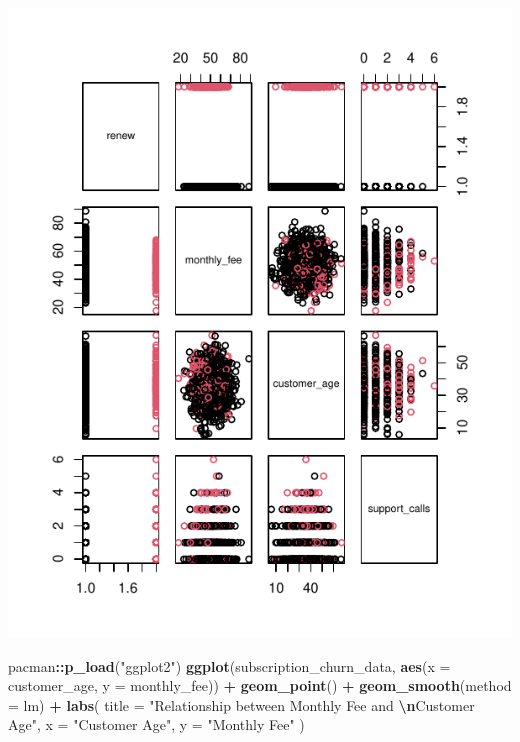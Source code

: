 \documentclass[
]{article}
\newenvironment{Shaded}{\begin{snugshade}}{\end{snugshade}}
\newcommand{\AttributeTok}[1]{\textcolor[rgb]{0.13,0.29,0.53}{#1}}
\newcommand{\FunctionTok}[1]{\textcolor[rgb]{0.13,0.29,0.53}{\textbf{#1}}}
\newcommand{\NormalTok}[1]{#1}
\newcommand{\SpecialCharTok}[1]{\textcolor[rgb]{0.81,0.36,0.00}{\textbf{#1}}}
\newcommand{\StringTok}[1]{\textcolor[rgb]{0.31,0.60,0.02}{#1}}
\begin{document}
\includegraphics{3_logistic_regression_files/figure-latex/scatter_plot_1-1.pdf}

\begin{Shaded}
\begin{Highlighting}[]
\NormalTok{pacman}\SpecialCharTok{::}\FunctionTok{p\_load}\NormalTok{(}\StringTok{"ggplot2"}\NormalTok{)}
\FunctionTok{ggplot}\NormalTok{(subscription\_churn\_data,}
       \FunctionTok{aes}\NormalTok{(}\AttributeTok{x =}\NormalTok{ customer\_age, }\AttributeTok{y =}\NormalTok{ monthly\_fee)) }\SpecialCharTok{+} 
  \FunctionTok{geom\_point}\NormalTok{() }\SpecialCharTok{+}
  \FunctionTok{geom\_smooth}\NormalTok{(}\AttributeTok{method =}\NormalTok{ lm) }\SpecialCharTok{+}
  \FunctionTok{labs}\NormalTok{(}
    \AttributeTok{title =} \StringTok{"Relationship between Monthly Fee and }\SpecialCharTok{\textbackslash{}n}\StringTok{Customer Age"}\NormalTok{,}
    \AttributeTok{x =} \StringTok{"Customer Age"}\NormalTok{,}
    \AttributeTok{y =} \StringTok{"Monthly Fee"}
\NormalTok{  )}
\end{Highlighting}
\end{Shaded}
\end{document}
